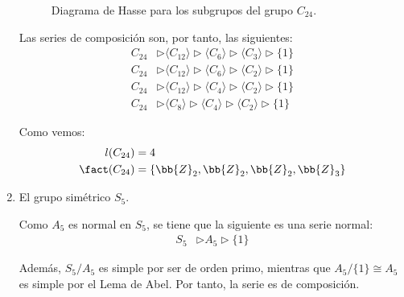\begin{ejercicio}
\begin{enumerate}
\begin{figure}
            \caption{Diagrama de Hasse para los subgrupos del grupo $C_{24}$.}
            \label{fig:Hasse_C24}
        \end{figure}
        
        Las series de composición son, por tanto, las siguientes:
        \begin{align*}
            C_{24} &\rhd \langle C_{12} \rangle \rhd \langle C_{6} \rangle \rhd \langle C_{3} \rangle \rhd \{1\} \\
            C_{24} &\rhd \langle C_{12} \rangle \rhd \langle C_{6} \rangle \rhd \langle C_{2} \rangle \rhd \{1\} \\
            C_{24} &\rhd \langle C_{12} \rangle \rhd \langle C_{4} \rangle \rhd \langle C_{2} \rangle \rhd \{1\} \\
            C_{24} &\rhd \langle C_{8} \rangle \rhd \langle C_{4} \rangle \rhd \langle C_{2} \rangle \rhd \{1\}
        \end{align*}

        Como vemos:
        \begin{align*}
            l(C_{24}) &= 4 \\
            \fact(C_{24}) &= \{\bb{Z}_2, \bb{Z}_2, \bb{Z}_2, \bb{Z}_3\}
        \end{align*}

        \item El grupo simétrico $S_5$.
        
        Como $A_5$ es normal en $S_5$, se tiene que la siguiente es una serie normal:
        \begin{align*}
            S_5 &\rhd A_5 \rhd \{1\}
        \end{align*}

        Además, $S_5/A_5$ es simple por ser de orden primo, mientras que $A_5/\{1\}\cong A_5$ es simple por el Lema de Abel. Por tanto, la serie es de composición.


\end{enumerate}
\end{ejercicio}
